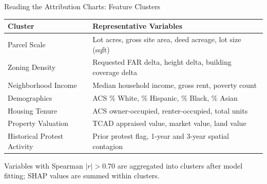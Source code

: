 \documentclass[10pt, aspectratio=169]{beamer}
\begin{document}
\begin{frame}{Reading the Attribution Charts: Feature Clusters}
    \small
    \begin{tabular}{p{3.2cm} p{8.5cm}}
        \toprule
        \textbf{Cluster} & \textbf{Representative Variables} \\
        \midrule
        Parcel Scale & Lot acres, gross site area, deed acreage, lot size (sqft) \\
        Zoning Density & Requested FAR delta, height delta, building coverage delta \\
        Neighborhood Income & Median household income, gross rent, poverty count \\
        Demographics & ACS \% White, \% Hispanic, \% Black, \% Asian \\
        Housing Tenure & ACS owner-occupied, renter-occupied, total units \\
        Property Valuation & TCAD appraised value, market value, land value \\
        Historical Protest Activity & Prior protest flag, 1-year and 3-year spatial contagion \\
        \bottomrule
    \end{tabular}
    \vspace{0.5em}

    \footnotesize Variables with Spearman $|r|>0.70$ are aggregated into clusters after model fitting; SHAP values are summed within clusters.
\end{frame}
\end{document}
